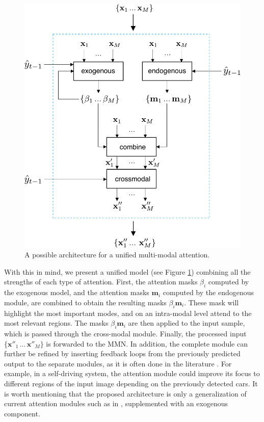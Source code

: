 \begin{figure}[hbt!]
\centering
\includegraphics[scale=0.75]{figures/unified}
\caption{A possible architecture for a unified multi-modal attention.}
\label{fig:complete-model}
\end{figure}

With this in mind, we present a unified model (see Figure \ref{fig:complete-model}) combining all the strengths of each type of attention. First, the attention masks $\beta_i$ computed by the exogenous model, and the attention masks $\mathbf{m}_i$ computed by the endogenous module, are combined to obtain the resulting masks $\beta_i\mathbf{m}_i$. These mask will highlight the most important modes, and on an intra-modal level attend to the most relevant regions. The masks $\beta_i\mathbf{m}_i$ are then applied to the input sample, which is passed through the cross-modal module. Finally, the processed input $\{\mathbf{x}''_1\,...\,\mathbf{x}''_M\}$ is forwarded to the MMN. In addition, the complete module can further be refined by inserting feedback loops from the previously predicted output to the separate modules, as it is often done in the literature \citep{afouras, attention-need, bahdanau}. For example, in a self-driving system, the attention module could improve its focus to different regions of the input image depending on the previously detected cars. It is worth mentioning that the proposed architecture is only a generalization of current attention modules such as in \citep{afouras}, supplemented with an exogenous component.


